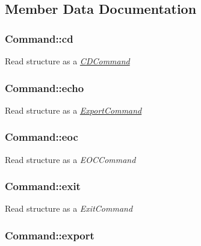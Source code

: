 \subsection{Member Data Documentation}
\hypertarget{unionCommand_a488c8f6e6ce10f7c9126f37c5f37776d}{
\subsubsection[{cd}]{ Command\-::cd}}\label{unionCommand_a488c8f6e6ce10f7c9126f37c5f37776d}
Read structure as a {\itshape \hyperlink{structCDCommand}{C\-D\-Command}} \hypertarget{unionCommand_a74de4769cc35dac9a3f7dfd24cb87ad7}{
\subsubsection[{echo}]{ Command\-::echo}}\label{unionCommand_a74de4769cc35dac9a3f7dfd24cb87ad7}
Read structure as a {\itshape \hyperlink{structExportCommand}{Export\-Command}} \hypertarget{unionCommand_a062a1645e04deb34460595c902a49c44}{
\subsubsection[{eoc}]{ Command\-::eoc}}\label{unionCommand_a062a1645e04deb34460595c902a49c44}
Read structure as a {\itshape E\-O\-C\-Command} \hypertarget{unionCommand_ab516bde009e6b06c4b342d7f5bf35ece}{
\subsubsection[{exit}]{ Command\-::exit}}\label{unionCommand_ab516bde009e6b06c4b342d7f5bf35ece}
Read structure as a {\itshape Exit\-Command} \hypertarget{unionCommand_a57e7a8eb0763aa7105d3bc6a52e59da3}{
\subsubsection[{export}]{ Command\-::export}}\label{unionCommand_a57e7a8eb0763aa7105d3bc6a52e59da3}

